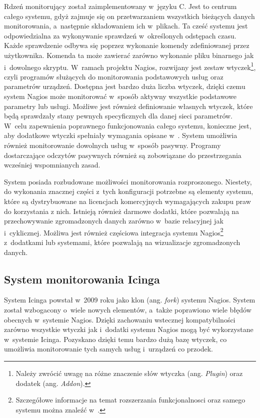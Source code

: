 Rdzeń monitorujący został zaimplementowany w~języku C. Jest to centrum
całego systemu, gdyż zajmuje się on przetwarzaniem wszystkich
bieżących danych monitorowania, a~następnie składowaniem ich
w~plikach. Ta cześć systemu jest odpowiedzialna za wykonywanie
sprawdzeń w~określonych odstępach czasu. Każde sprawdzenie odbywa się
poprzez wykonanie komendy zdefiniowanej przez użytkownika. Komenda ta
może zawierać zarówno wykonanie pliku binarnego jak i~dowolnego
skryptu. W~ramach projektu Nagios, rozwijany jest zestaw
wtyczek\footnote{Należy zwrócić uwagę na różne znaczenie słów wtyczka
  (ang. {\em Plugin}) oraz dodatek (ang. {\em Addon}). }, czyli
programów służących do monitorowania podstawowych usług oraz
parametrów urządzeń. Dostępna jest bardzo duża liczba wtyczek, dzięki
czemu system Nagios może monitorować w~sposób aktywny wszystkie
podstawowe parametry lub usługi. Możliwe jest również definiowanie
własnych wtyczek, które będą sprawdzały stany pewnych specyficznych
dla danej sieci parametrów. W~celu zapewnienia poprawnego
funkcjonowania całego systemu, konieczne jest, aby dodatkowe wtyczki
spełniały wymagania opisane w~\cite{www:NagiosPluginsTutorial}. System
umożliwia również monitorowanie dowolnych usług w~sposób
pasywny. Programy dostarczające odczytów pasywnych również są
zobowiązane do przestrzegania wcześniej wspomnianych zasad.

System posiada rozbudowane możliwości monitorowania
rozproszonego. Niestety, do wykonania znacznej części z~tych
konfiguracji potrzebne są elementy systemu, które są dystrybuowane na
licencjach komercyjnych wymagających zakupu praw do korzystania z
nich. Istnieją również darmowe dodatki, które pozwalają na
przechowywanie zgromadzonych danych zarówno w~bazie relacyjnej jak
i~cyklicznej. Możliwa jest również częściowa integracja systemu
Nagios\footnote{Szczegółowe informacje na temat rozszerzania
  funkcjonalnosci oraz samego systemu można znaleźć
  w~\cite{www:Nagios}.}  z~dodatkami lub systemami, które pozwalają na
wizualizacje zgromadzonych danych.

\subsection[Icinga][System monitorowania Icinga]{System monitorowania Icinga}
\label{subsec:Icinga}

System Icinga powstał w~2009 roku jako klon (ang. {\em fork}) systemu
Nagios. System został wzbogacony o~wiele nowych elementów, a~także
poprawiono wiele błędów obecnych w~systemie Nagios. Dzięki zachowaniu
wstecznej kompatybilności zarówno wszystkie wtyczki jak i~dodatki
systemu Nagios mogą być wykorzystane w~systemie Icinga. Pozyskano
dzięki temu bardzo dużą bazę wtyczek, co umożliwia monitorowanie tych
samych usług i~urządzeń co przodek.

